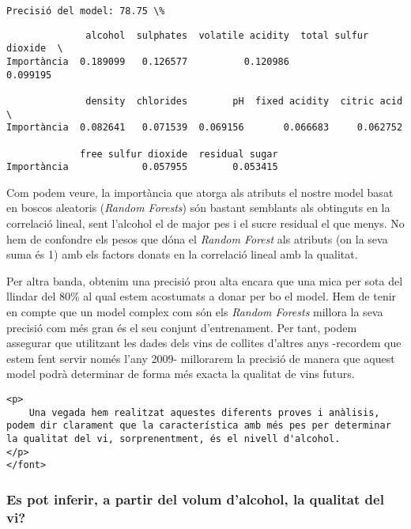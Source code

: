 \documentclass[11pt]{article}
\begin{document}
    \begin{Verbatim}[commandchars=\\\{\}]
Precisió del model: 78.75 \%

    \end{Verbatim}

    
    \begin{verbatim}
              alcohol  sulphates  volatile acidity  total sulfur dioxide  \
Importància  0.189099   0.126577          0.120986              0.099195   

              density  chlorides        pH  fixed acidity  citric acid  \
Importància  0.082641   0.071539  0.069156       0.066683     0.062752   

             free sulfur dioxide  residual sugar  
Importància             0.057955        0.053415  
    \end{verbatim}

    
    Com podem veure, la importància que atorga als atributs el nostre model
basat en boscos aleatoris (\emph{Random Forests}) són bastant semblants
als obtinguts en la correlació lineal, sent l'alcohol el de major pes i
el sucre residual el que menys. No hem de confondre els pesos que dóna
el \emph{Random Forest} als atributs (on la seva suma és 1) amb els
factors donats en la correlació lineal amb la qualitat.

Per altra banda, obtenim una precisió prou alta encara que una mica per
sota del llindar del 80\% al qual estem acostumats a donar per bo el
model. Hem de tenir en compte que un model complex com són els
\emph{Random Forests} millora la seva precisió com més gran és el seu
conjunt d'entrenament. Per tant, podem assegurar que utilitzant les
dades dels vins de collites d'altres anys -recordem que estem fent
servir només l'any 2009- millorarem la precisió de manera que aquest
model podrà determinar de forma més exacta la qualitat de vins futurs.

\begin{verbatim}
<p>
    Una vegada hem realitzat aquestes diferents proves i anàlisis, podem dir clarament que la característica amb més pes per determinar la qualitat del vi, sorprenentment, és el nivell d'alcohol.
</p>
</font>
\end{verbatim}

    \hypertarget{es-pot-inferir-a-partir-del-volum-dalcohol-la-qualitat-del-vi}{%
\subsubsection{Es pot inferir, a partir del volum d'alcohol, la qualitat
del
vi?}\label{es-pot-inferir-a-partir-del-volum-dalcohol-la-qualitat-del-vi}}
\end{document}

